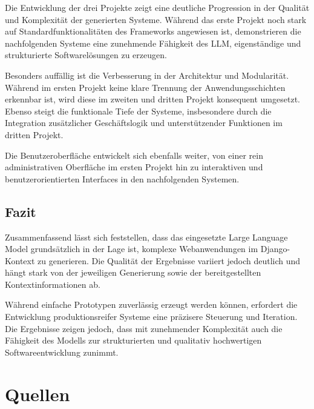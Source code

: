 Die Entwicklung der drei Projekte zeigt eine deutliche Progression in der Qualität und Komplexität der generierten Systeme. Während das erste Projekt noch stark auf Standardfunktionalitäten des Frameworks angewiesen ist, demonstrieren die nachfolgenden Systeme eine zunehmende Fähigkeit des LLM, eigenständige und strukturierte Softwarelösungen zu erzeugen.

Besonders auffällig ist die Verbesserung in der Architektur und Modularität. Während im ersten Projekt keine klare Trennung der Anwendungsschichten erkennbar ist, wird diese im zweiten und dritten Projekt konsequent umgesetzt. Ebenso steigt die funktionale Tiefe der Systeme, insbesondere durch die Integration zusätzlicher Geschäftslogik und unterstützender Funktionen im dritten Projekt.

Die Benutzeroberfläche entwickelt sich ebenfalls weiter, von einer rein administrativen Oberfläche im ersten Projekt hin zu interaktiven und benutzerorientierten Interfaces in den nachfolgenden Systemen.

\subsection{Fazit}

Zusammenfassend lässt sich feststellen, dass das eingesetzte Large Language Model grundsätzlich in der Lage ist, komplexe Webanwendungen im Django-Kontext zu generieren. Die Qualität der Ergebnisse variiert jedoch deutlich und hängt stark von der jeweiligen Generierung sowie der bereitgestellten Kontextinformationen ab.

Während einfache Prototypen zuverlässig erzeugt werden können, erfordert die Entwicklung produktionsreifer Systeme eine präzisere Steuerung und Iteration. Die Ergebnisse zeigen jedoch, dass mit zunehmender Komplexität auch die Fähigkeit des Modells zur strukturierten und qualitativ hochwertigen Softwareentwicklung zunimmt.


\section{Quellen}

